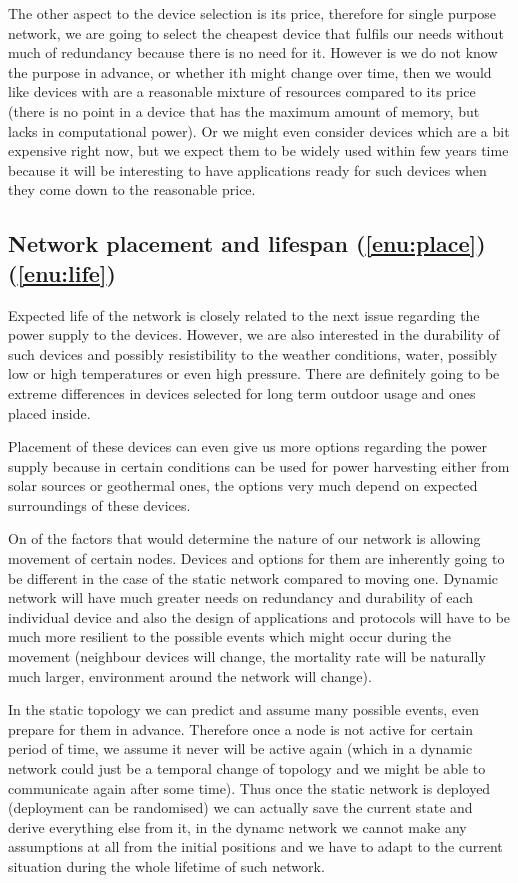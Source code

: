 \documentclass[
  print, %
  table,   %
  nolof,     %
  nolot,     %
           oneside
]{fithesis3}
\begin{document}
  The other aspect to the device selection is its price, therefore for single purpose network, we are going to select the cheapest device that fulfils our needs without much of redundancy because there is no need for it. However is we do not know the purpose in advance, or whether ith might change over time, then we would like devices with are a reasonable mixture of resources compared to its price (there is no point in a device that has the maximum amount of memory, but lacks in computational power). Or we might even consider devices which are a bit expensive right now, but we expect them to be widely used within few years time because it will be interesting to have applications ready for such devices when they come down to the reasonable price.

  \subsection{Network placement and lifespan (\ref{enu:place}) (\ref{enu:life})}
  Expected life of the network is closely related to the next issue regarding the power supply to the devices. However, we are also interested in the durability of such devices and possibly resistibility to the weather conditions, water, possibly low or high temperatures or even high pressure. There are definitely going to be extreme differences in devices selected for long term outdoor usage and ones placed inside.

  Placement of these devices can even give us more options regarding the power supply because in certain conditions can be used for power harvesting either from solar sources or geothermal ones, the options very much depend on expected surroundings of these devices.

  On of the factors that would determine the nature of our network is allowing movement of certain nodes. Devices and options for them are inherently going to be different in the case of the static network compared to moving one. Dynamic network will have much greater needs on redundancy and durability of each individual device and also the design of applications and protocols will have to be much more resilient to the possible events which might occur during the movement (neighbour devices will change, the mortality rate will be naturally much larger, environment around the network will change).

  In the static topology we can predict and assume many possible events, even prepare for them in advance. Therefore once a node is not active for certain period of time, we assume it never will be active again (which in a dynamic network could just be a temporal change of topology and we might be able to communicate again after some time). Thus once the static network is deployed (deployment can be randomised) we can actually save the current state and derive everything else from it, in the dynamc network we cannot make any assumptions at all from the initial positions and we have to adapt to the current situation during the whole lifetime of such network.
\end{document}
